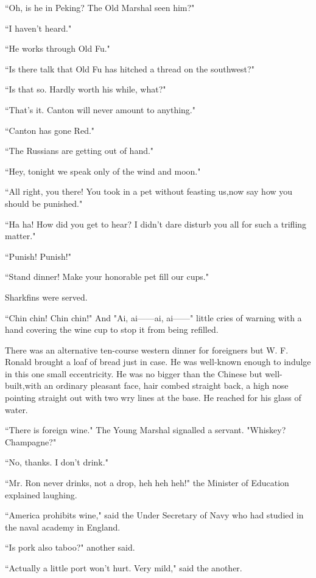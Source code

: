 \par ``Oh, is he in Peking? The Old Marshal seen him?"
\par ``I haven't heard."
\par ``He works through Old Fu."
\par ``Is there talk that Old Fu has hitched a thread on the southwest?"
\par ``Is that so. Hardly worth his while, what?"
\par ``That's it. Canton will never amount to anything."
\par ``Canton has gone Red."
\par ``The Russians are getting out of hand."
\par ``Hey, tonight we speak only of the wind and moon."
\par ``All right, you there! You took in a pet without feasting us,now say how you should be punished."
\par ``Ha ha! How did you get to hear? I didn't dare disturb you all for such a trifling matter."
\par ``Punish! Punish!"
\par ``Stand dinner! Make your honorable pet fill our cups."
\par Sharkfins were served.
\par ``Chin chin! Chin chin!" And "Ai, ai——ai, ai——" little cries of warning with a hand covering the wine cup to stop it from being refilled.
\par There was an alternative ten-course western dinner for foreigners but W. F. Ronald brought a loaf of bread just in case. He was well-known enough to indulge in this one small eccentricity. He was no bigger than the Chinese but well-built,with an ordinary pleasant face, hair combed straight back, a high nose pointing straight out with two wry lines at the base. He reached for his glass of water.
\par ``There is foreign wine." The Young Marshal signalled a servant. "Whiskey? Champagne?"
\par ``No, thanks. I don't drink."
\par ``Mr. Ron never drinks, not a drop, heh heh heh!" the Minister of Education explained laughing.
\par ``America prohibits wine," said the Under Secretary of Navy who had studied in the naval academy in England.
\par ``Is pork also taboo?" another said.
\par ``Actually a little port won't hurt. Very mild," said the another.
